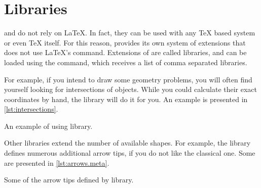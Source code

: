 \section{Libraries}

 and \TikZ{} do not rely on \LaTeX{}. In fact, they can be used with
any \TeX{} based system or even \TeX{} itself. For this reason, \TikZ{}
provides its own system of extensions that does not use \LaTeX{}'s
 command. Extensions of \TikZ{} are called libraries, and can be
loaded using the  command, which receives a list of comma
separated libraries.

For example, if you intend to draw some geometry problems, you will often find
yourself looking for intersections of objects. While you could calculate
their exact coordinates by hand, the  library will do it
for you. An example is presented in \autoref{lst:intersections}.

\begin{listing}
  \begin{example}[vertical_mode, examplewidth=0.8\linewidth]
\usetikzlibrary{intersections}

\end{example}
  \caption{An example of using 
    library.}\label{lst:intersections}
\end{listing}

Other libraries extend the number of available shapes. For example, the
 library defines numerous additional arrow tips, if you do
not like the classical one. Some are presented in
\autoref{lst:arrows.meta}.

\begin{listing}
  \begin{example}[vertical_mode, examplewidth=0.8\linewidth]
\usetikzlibrary{arrows.meta}

\end{example}
  \caption{Some of the arrow tips defined by 
    library.}\label{lst:arrows.meta}
\end{listing}

